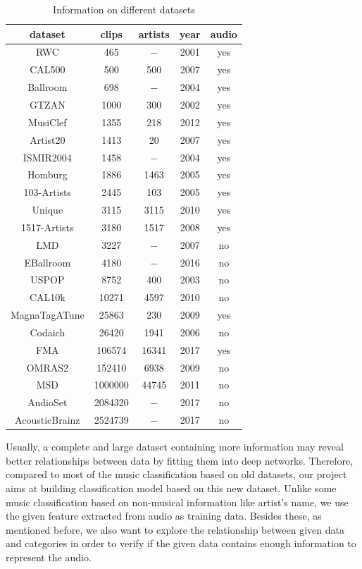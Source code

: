 \documentclass{article}
\begin{document}
\begin{table}[h!]
\centering
\begin{tabular}{*{5}{c}} \hline
dataset & clips & artists & year & audio \\ \hline
RWC & 465 & $-$ & 2001 & yes \\
CAL500 & 500 & 500 & 2007 & yes \\
Ballroom&  698& $-$ & 2004 & yes \\
GTZAN&  1000& 300 & 2002 & yes \\
MusiClef&  1355&  218 & 2012 & yes \\
Artist20&  1413& 20 &  2007&  yes \\
ISMIR2004&  1458 &  $-$ & 2004 & yes  \\
Homburg& 1886 & 1463 & 2005 & yes \\
103-Artists & 2445 & 103 & 2005 & yes \\  
Unique& 3115 & 3115 & 2010 & yes \\
1517-Artists& 3180 & 1517 & 2008 & yes \\
LMD& 3227 & $-$ & 2007 & no \\
EBallroom& 4180 & $-$ & 2016 & no\\ 
USPOP&8752  & 400 & 2003 & no \\
CAL10k& 10271 & 4597 & 2010 & no \\
MagnaTagATune& 25863 & 230 & 2009 & yes \\
Codaich& 26420 & 1941 & 2006 & no \\
FMA& 106574 & 16341 & 2017 & yes \\
OMRAS2 & 152410 & 6938 & 2009 & no \\
MSD& 1000000 & 44745 & 2011 & no \\
AudioSet& 2084320 & $-$ & 2017 & no \\
AcousticBrainz& 2524739 & $-$ & 2017 & no \\ 
\end{tabular}
\caption{Information on different datasets \citep{fma}}
\label{table:1}
\end{table}

Usually, a complete and large dataset containing more information may reveal better relationships between data by fitting them into deep networks. Therefore, compared to most of the music classification based on old datasets, our project aims at building classification model based on this new dataset. Unlike some music classification based on non-musical information like artist's name, we use the given feature extracted from audio as training data. Besides these, as mentioned before, we also want to explore the relationship between given data and categories in order to verify if the given data contains enough information to represent the audio.
\end{document}
